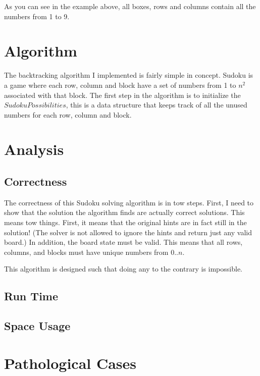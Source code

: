 \documentclass{sig-alternate-05-2015}
\begin{document}
As you can see in the example above, all boxes, rows and columns contain all
the numbers from 1 to 9.

\section{Algorithm}

The backtracking algorithm I implemented is fairly simple in concept. Sudoku is
a game where each row, column and block have a set of numbers from 1 to $n^2$
associated with that block. The first step in the algorithm is to initialize
the $SudokuPossibilities$, this is a data structure that keeps track of all
the unused numbers for each row, column and block.

\section{Analysis}

\subsection{Correctness}

The correctness of this Sudoku solving algorithm is in tow steps. %
First, I need to show that the solution the algorithm finds are actually correct
solutions. This means tow things. First, it means that the original hints are
in fact still in the solution! (The solver is not allowed to ignore the hints
and return just any valid board.) In addition, the board state must be valid. This
means that all rows, columns, and blocks must have unique numbers from $0..n$.

This algorithm is designed such that doing any to the contrary is impossible.

\subsection{Run Time}

\subsection{Space Usage}

\section{Pathological Cases}
\end{document}
